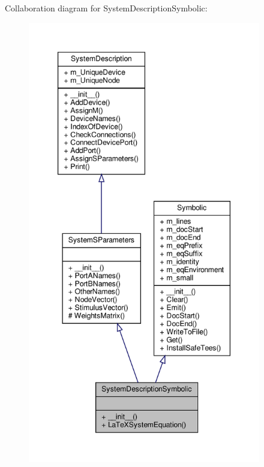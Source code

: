 Collaboration diagram for System\+Description\+Symbolic\+:\nopagebreak
\begin{figure}[H]
\begin{center}
\leavevmode
\includegraphics[height=550pt]{classSignalIntegrity_1_1SystemDescriptions_1_1SystemDescriptionSymbolic_1_1SystemDescriptionSymbolic__coll__graph}
\end{center}
\end{figure}
